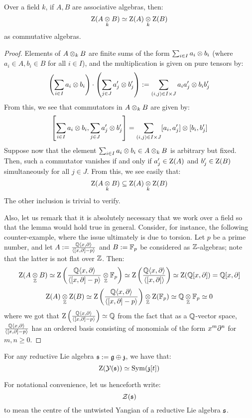         \begin{lemma} \label{lemma: centres_of_tensor_products_of_algebras}
            Over a field $k$, if $A, B$ are associative algebras, then:
                $$\rmZ(A \tensor_k B) \cong \rmZ(A) \tensor_k \rmZ(B)$$
            as commutative algebras.
        \end{lemma}
            \begin{proof}
                Elements of $A \tensor_k B$ are finite sums of the form $\sum_{i \in I} a_i \tensor b_i$ (where $a_i \in A, b_i \in B$ for all $i \in I$), and the multiplication is given on pure tensors by:
                    $$\left( \sum_{i \in I} a_i \tensor b_i \right) \cdot \left( \sum_{j \in J} a'_j \tensor b'_j \right) := \sum_{(i, j) \in I \x J} a_i a'_j \tensor b_i b'_j$$
                From this, we see that commutators in $A \tensor_k B$ are given by:
                    $$\left[ \sum_{i \in I} a_i \tensor b_i, \sum_{j \in J} a'_j \tensor b'_j \right] = \sum_{(i, j) \in I \x J} [a_i, a'_j] \tensor [b_i, b'_j]$$
                Suppose now that the element $\sum_{i \in I} a_i \tensor b_i \in A \tensor_k B$ is arbitrary but fixed. Then, such a commutator vanishes if and only if $a'_j \in \mathrm{Z}(A)$ and $b'_j \in \mathrm{Z}(B)$ simultaneously for all $j \in J$. From this, we see easily that:
                    $$\rmZ(A \tensor_k B) \subseteq \rmZ(A) \tensor_k \rmZ(B)$$
                The other inclusion is trivial to verify.

                Also, let us remark that it is absolutely necessary that we work over a field so that the lemma would hold true in general. Consider, for instance, the following counter-example, where the issue ultimately is due to torsion. Let $p$ be a prime number, and let $A := \frac{\mathbb{Q}\langle x, \partial\rangle}{\langle[x, \partial] - p\rangle}$ and $B := \mathbb{F}_p$ be considered as $\mathbb{Z}$-algebras; note that the latter is not flat over $\mathbb{Z}$. Then:
                    $$\rmZ(A \tensor_{\Z} B) \cong \rmZ\left( \frac{\Q\<x, \del\>}{\<[x, \del] - p\>} \tensor_{\Z} \F_p \right) \cong \rmZ\left( \frac{\Q\<x, \del\>}{\<[x, \del]\>} \right) \cong \rmZ(\Q[x, \del]) = \Q[x, \del]$$
                    $$\rmZ(A) \tensor_{\Z} \rmZ(B) \cong \rmZ\left( \frac{\Q\<x, \del\>}{\<[x, \del] - p\>} \right) \tensor_{\Z} \rmZ(\F_p) \cong \Q \tensor_{\Z} \F_p \cong 0$$
                where we got that $\mathrm{Z}\left( \frac{\mathbb{Q}\langle x, \partial\rangle}{\langle[x, \partial] - p\rangle} \right) \simeq \mathbb{Q}$ from the fact that as a $\mathbb{Q}$-vector space, $\frac{\mathbb{Q}\langle x, \partial\rangle}{\langle[x, \partial] - p\rangle}$ has an ordered basis consisting of monomials of the form $x^m \partial^n$ for $m, n \geq 0$.
            \end{proof}
        \begin{corollary}
            For any reductive Lie algebra $\mathfrak{s} := \mathfrak{g} \oplus \mathfrak{z}$, we have that:
                $$\mathrm{Z}( \mathcal{Y}(\mathfrak{s}) ) \simeq \mathrm{Sym}(\mathfrak{z}[t])$$
        \end{corollary}
        \begin{convention}
            For notational convenience, let us henceforth write:
                $$\mathcal{Z}(\mathfrak{s})$$
            to mean the centre of the untwisted Yangian of a reductive Lie algebra $\mathfrak{s}$.
        \end{convention}
            
